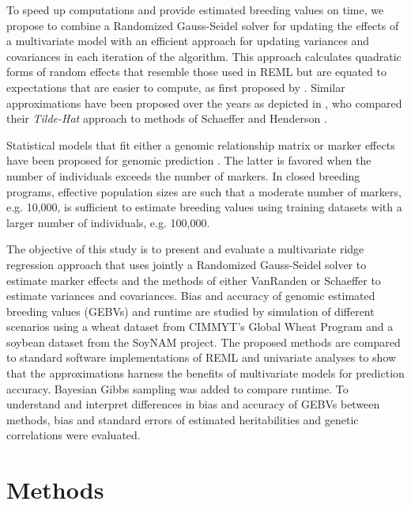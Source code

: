 \documentclass{bmcart}
\begin{document}
To speed up computations and provide estimated breeding values on time, we propose to combine a Randomized Gauss-Seidel \cite{LL2010,Ma2015} solver for updating the effects of a multivariate model with an efficient approach for updating variances and covariances in each iteration of the algorithm. This approach calculates quadratic forms of random effects that resemble those used in REML but are equated to expectations that are easier to compute, as first proposed by \cite{CunninghamHenderson1968, Thompson1969}. Similar approximations have been proposed over the years as depicted in \cite{VanRaden}, who compared their \textsl{Tilde-Hat} approach to methods of Schaeffer \cite{Schaeffer} and Henderson \cite{Henderson1980}.

Statistical models that fit either a genomic relationship matrix or marker effects have been proposed for genomic prediction \cite{WGR2013}. The latter is favored when the number of individuals exceeds the number of markers. In closed breeding programs, effective population sizes are such that a moderate number of markers, e.g. 10,000, is sufficient to estimate breeding values using training datasets with a larger number of individuals, e.g. 100,000.


The objective of this study is to present and evaluate a multivariate ridge regression approach that uses jointly a Randomized Gauss-Seidel solver to estimate marker effects and the methods of either VanRanden \cite{VanRaden} or Schaeffer \cite{Schaeffer} to estimate variances and covariances. Bias and accuracy of genomic estimated breeding values (GEBVs) and runtime are studied by simulation of different scenarios using a wheat dataset from CIMMYT's Global Wheat Program and a soybean dataset from the SoyNAM project. The proposed methods are compared to standard software implementations of REML and univariate analyses to show that the approximations harness the benefits of multivariate models for prediction accuracy. Bayesian Gibbs sampling was added to compare runtime. To understand and interpret differences in bias and accuracy of GEBVs between methods, bias and standard errors of estimated heritabilities and genetic correlations were evaluated. 

\section{Methods}
\end{document}

